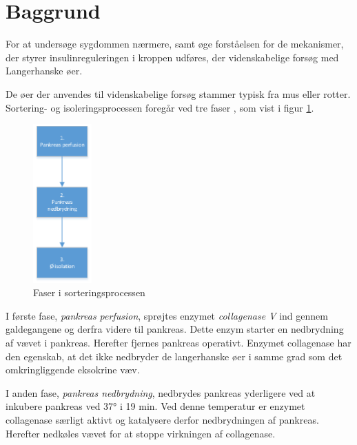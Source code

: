\section{Baggrund}
For at undersøge sygdommen nærmere, samt øge forståelsen for de mekanismer, der styrer insulinreguleringen i kroppen udføres, der videnskabelige forsøg med Langerhanske øer.

De øer der anvendes til videnskabelige forsøg stammer typisk fra mus eller rotter. Sortering- og isoleringsprocessen foregår ved tre faser \citep{per}, som vist i figur \ref{fig:sortproces}. 

\begin{figure}[H]
	\centering
	\includegraphics[width=0.2\textwidth]{billeder/sortering-crop.pdf}
	\caption{Faser i sorteringsprocessen}
	\label{fig:sortproces}
\end{figure}

I første fase, \textit{pankreas perfusion}, sprøjtes enzymet \textit{collagenase V} ind gennem galdegangene og derfra videre til  pankreas. Dette enzym starter en nedbrydning af vævet i pankreas. Herefter fjernes pankreas operativt. Enzymet collagenase har den egenskab, at det ikke nedbryder de langerhanske øer i samme grad som det omkringliggende eksokrine væv.

I anden fase, \textit{pankreas nedbrydning}, nedbrydes pankreas yderligere ved at inkubere pankreas ved 37° i 19 min. Ved denne temperatur er enzymet collagenase særligt aktivt og katalysere derfor nedbrydningen af pankreas. Herefter nedkøles vævet for at stoppe virkningen af collagenase.


